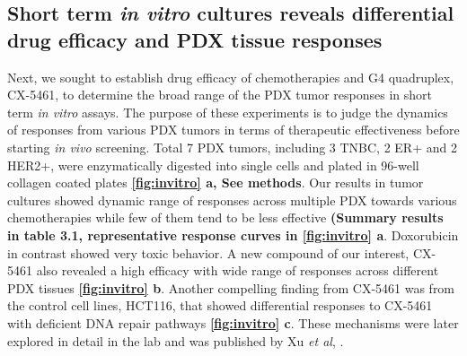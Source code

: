 \subsection{Short term \textit {in vitro} cultures reveals differential drug efficacy and PDX tissue responses
}
Next, we sought to establish drug efficacy of chemotherapies and G4 quadruplex, CX-5461, to determine the broad range of the PDX tumor responses in short term \textit{in vitro} assays. The purpose of these experiments is to judge the dynamics of responses from various PDX tumors in terms of therapeutic effectiveness before starting \textit{in vivo} screening. Total 7 PDX tumors, including 3 TNBC, 2 ER+ and 2 HER2+, were enzymatically digested into single cells and plated in 96-well collagen coated plates  \textbf{\autoref{fig:invitro} a, See methods}. 
Our results in tumor cultures showed dynamic range of responses across multiple PDX towards various chemotherapies while few of them tend to be less effective \textbf{(Summary results in table 3.1, representative response curves in \autoref{fig:invitro} a}. Doxorubicin in contrast showed very toxic behavior. A new compound of our interest, CX-5461 also revealed a high efficacy with wide range of responses across different PDX tissues \textbf{\autoref{fig:invitro} b}. Another compelling finding from CX-5461 was from the control cell lines, HCT116, that showed differential responses to CX-5461 with deficient DNA repair pathways \textbf{\autoref{fig:invitro} c}. These mechanisms were later explored in detail in the lab and was published by Xu \textit{et al}, \cite{xu2017cx}. 


